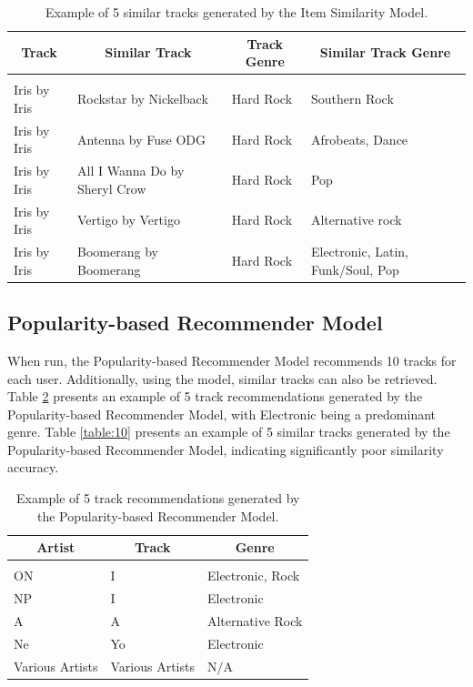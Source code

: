 \documentclass{article} %
\begin{document}
\begin{table}[ht]
\caption{Example of 5 similar tracks generated by the Item Similarity Model.}
\label{table:8}
\begin{center}
\begin{tabular}{p{2cm} p{4.6cm} p{2cm} p{2.5cm}}
\multicolumn{1}{c}{\bf Track} & \multicolumn{1}{c}{\bf Similar Track} & \multicolumn{1}{c}{\bf Track Genre} & \multicolumn{1}{c}{\bf Similar Track Genre}
\\ \hline \\
Iris by Iris & Rockstar by Nickelback & Hard Rock & Southern Rock\\
Iris by Iris & Antenna by Fuse ODG & Hard Rock & Afrobeats, Dance\\
Iris by Iris & All I Wanna Do by Sheryl Crow & Hard Rock & Pop\\
Iris by Iris & Vertigo by Vertigo & Hard Rock & Alternative rock\\
Iris by Iris & Boomerang by Boomerang & Hard Rock & Electronic, Latin, Funk/Soul, Pop\\
\end{tabular}
\end{center}
\end{table}

\subsection{Popularity-based Recommender Model}

When run, the Popularity-based Recommender Model recommends 10 tracks for each user. Additionally, using the model, similar tracks can also be retrieved. Table \ref{table:9} presents an example of 5 track recommendations generated by the Popularity-based Recommender Model, with Electronic being a predominant genre. Table \ref{table:10} presents an example of 5 similar tracks generated by the Popularity-based Recommender Model, indicating significantly poor similarity accuracy.

\begin{table}[!htbp]
\caption{Example of 5 track recommendations generated by the Popularity-based Recommender Model.}
\label{table:9}
\begin{center}
\begin{tabular}{l l l}
\multicolumn{1}{c}{\bf Artist} & \multicolumn{1}{c}{\bf Track} & \multicolumn{1}{c}{\bf Genre}
\\ \hline \\
ON              & I               & Electronic, Rock\\
NP              & I               & Electronic\\
A               & A               & Alternative Rock\\
Ne              & Yo              & Electronic\\
Various Artists & Various Artists & N/A\\
\end{tabular}
\end{center}
\end{table}
\end{document}
